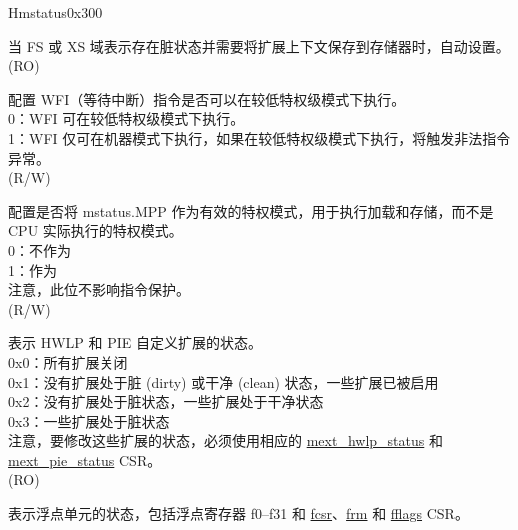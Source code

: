 \begin{register}{H}{mstatus}{0x300}\label{regdesc:MSTATUS}
%
%
%
%
%
%
%
%
%
%
%
%
%
%
%
\regnewline%
\begin{regdesc}\begin{reglist}
\label{fielddesc:MSTATUS_SD}\item [SD] 当 FS 或 XS 域表示存在脏状态并需要将扩展上下文保存到存储器时，自动设置。(RO)
\label{fielddesc:MSTATUSTW}\item [TW] 配置 WFI（等待中断）指令是否可以在较低特权级模式下执行。\\
0：WFI 可在较低特权级模式下执行。\\
1：WFI 仅可在机器模式下执行，如果在较低特权级模式下执行，将触发非法指令异常。\\
(R/W)
\label{fielddesc:MSTATUS_MPRV}\item [MPRV] 配置是否将 mstatus.MPP 作为有效的特权模式，用于执行加载和存储，而不是 CPU 实际执行的特权模式。\\
0：不作为\\
1：作为\\
注意，此位不影响指令保护。\\
(R/W) \\
\label{fielddesc:MSTATUS_XS}\item [XS] 表示 HWLP 和 PIE 自定义扩展的状态。\\
0x0：所有扩展关闭\\
0x1：没有扩展处于脏 (dirty) 或干净 (clean) 状态，一些扩展已被启用\\
0x2：没有扩展处于脏状态，一些扩展处于干净状态\\
0x3：一些扩展处于脏状态\\
注意，要修改这些扩展的状态，必须使用相应的 \hyperref[regdesc:MEXT_HWLP_STATUS]{mext\_hwlp\_status} 和 \hyperref[regdesc:MEXT_PIE_STATUS]{mext\_pie\_status} CSR。\\
(RO) \\
\label{fielddesc:MSTATUS_FS}\item [FS] 表示浮点单元的状态，包括浮点寄存器 f0–f31 和 \hyperref[regdesc:FCSR]{fcsr}、\hyperref[regdesc:FCSR]{frm} 和 \hyperref[regdesc:FFLAGS]{fflags} CSR。\\

\end{reglist}
\end{regdesc}
\end{register}
